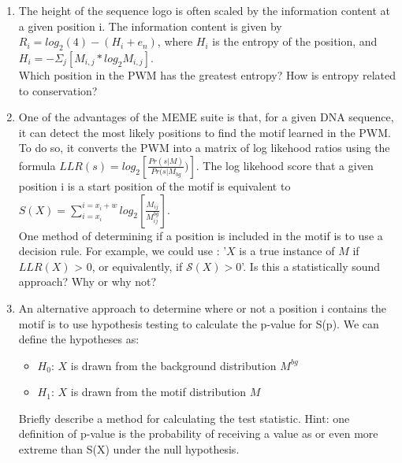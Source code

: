 \begin{enumerate}
\begin{solution}
\end{solution}

\item 
The height of the sequence logo is often scaled by the information content at a given position i. The information content is given by $R_i = log_2(4) - (H_i + e_n)$, where $H_i$ is the entropy of the position, and $H_i = -\Sigma_j [M_{i,j} * log_2 M_{i,j}]$. \\
Which position in the PWM has the greatest entropy? How is entropy related to conservation?
\begin{solution}

\end{solution}

\item One of the advantages of the MEME suite is that, for a given DNA sequence, it can detect the most likely positions to find the motif learned in the PWM. To do so, it converts the PWM into a matrix of log likehood ratios using the formula $LLR(s) = log_2[\frac{Pr(s|M)}{Pr(s|M_{bg}})]$. The log likehood score that a given position i is a start position of the motif is equivalent to $S(X) = \sum_{i=x_i}^{i=x_i+w} log_2[\frac{M_{ij}}{M_{ij}^{bg}}]$. \\

One method of determining if a position is included in the motif is to use a decision rule. For example, we could use : '$X$ is a true instance of $M$ if $LLR(X)$ > 0, or equivalently, if $\mathcal S(X) > 0$'.
Is this a statistically sound approach? Why or why not?

\begin{solution}

\end{solution}

\item An alternative approach to determine where or not a position i contains the motif is to use hypothesis testing to calculate the p-value for S(p). We can define the hypotheses as:
\begin{itemize}
    \item $H_0$: $X$ is drawn from the background distribution $M^{bg}$
    \item $H_1$: $X$ is drawn from the motif distribution $M$ 
\end{itemize}
Briefly describe a method for calculating the test statistic. Hint: one definition of p-value is the probability of receiving a value as or even more extreme than S(X) under the null hypothesis. 

\begin{solution}

\end{solution}

\end{enumerate}

